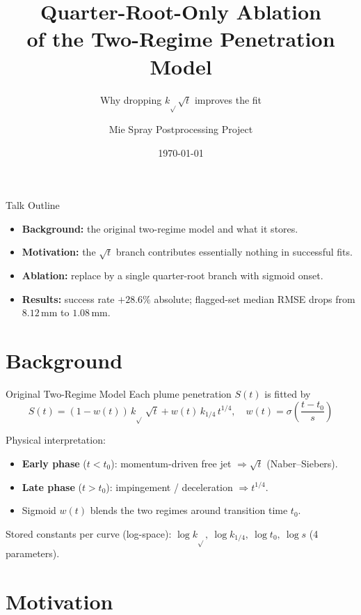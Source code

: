 \documentclass[UTF8,aspectratio=169]{ctexbeamer}
\title{Quarter-Root-Only Ablation\\of the Two-Regime Penetration Model}
\subtitle{Why dropping $k_{\sqrt{}}\sqrt{t}$ improves the fit}
\author{Mie Spray Postprocessing Project}
\date{\today}
\begin{document}
\begin{frame}
  \titlepage
\end{frame}

\begin{frame}{Talk Outline}
\begin{itemize}
  \item \textbf{Background:} the original two-regime model and what it stores.
  \item \textbf{Motivation:} the $\sqrt{t}$ branch contributes essentially nothing
        in successful fits.
  \item \textbf{Ablation:} replace by a single quarter-root branch with sigmoid onset.
  \item \textbf{Results:} success rate $+28.6\%$ absolute; flagged-set median RMSE
        drops from $8.12\,$mm to $1.08\,$mm.
\end{itemize}
\end{frame}

\section{Background}

\begin{frame}{Original Two-Regime Model}
Each plume penetration $S(t)$ is fitted by
\[
S(t) = (1-w(t))\,k_{\sqrt{}}\,\sqrt{t} + w(t)\,k_{1/4}\,t^{1/4},
\quad
w(t)=\sigma\!\left(\frac{t-t_0}{s}\right)
\]

\vspace{0.5em}
Physical interpretation:
\begin{itemize}
  \item \textbf{Early phase} ($t<t_0$): momentum-driven free jet $\Rightarrow \sqrt{t}$
        (Naber--Siebers).
  \item \textbf{Late phase} ($t>t_0$): impingement / deceleration $\Rightarrow t^{1/4}$.
  \item Sigmoid $w(t)$ blends the two regimes around transition time $t_0$.
\end{itemize}

\vspace{0.5em}
Stored constants per curve (log-space):
$\log k_{\sqrt{}},\ \log k_{1/4},\ \log t_0,\ \log s$ \quad (4 parameters).
\end{frame}

\section{Motivation}
\end{document}
